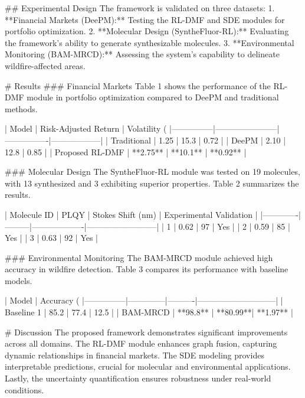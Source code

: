 ## Experimental Design
The framework is validated on three datasets:
1. **Financial Markets (DeePM):** Testing the RL-DMF and SDE modules for portfolio optimization.
2. **Molecular Design (SyntheFluor-RL):** Evaluating the framework’s ability to generate synthesizable molecules.
3. **Environmental Monitoring (BAM-MRCD):** Assessing the system's capability to delineate wildfire-affected areas.

# Results
### Financial Markets
Table 1 shows the performance of the RL-DMF module in portfolio optimization compared to DeePM and traditional methods.

| Model         | Risk-Adjusted Return | Volatility (%
|---------------|-----------------------|----------------|------------------|
| Traditional   | 1.25                 | 15.3           | 0.72             |
| DeePM         | 2.10                 | 12.8           | 0.85             |
| Proposed RL-DMF | **2.75**            | **10.1**       | **0.92**         |

### Molecular Design
The SyntheFluor-RL module was tested on 19 molecules, with 13 synthesized and 3 exhibiting superior properties. Table 2 summarizes the results.

| Molecule ID | PLQY    | Stokes Shift (nm) | Experimental Validation |
|-------------|---------|-------------------|--------------------------|
| 1           | 0.62    | 97                | Yes                      |
| 2           | 0.59    | 85                | Yes                      |
| 3           | 0.63    | 92                | Yes                      |

### Environmental Monitoring
The BAM-MRCD module achieved high accuracy in wildfire detection. Table 3 compares its performance with baseline models.

| Model         | Accuracy (%
|---------------|--------------|----------|-----------------------------|
| Baseline 1    | 85.2         | 77.4     | 12.5                        |
| BAM-MRCD      | **98.8**     | **80.99**| **1.97**                    |

# Discussion
The proposed framework demonstrates significant improvements across all domains. The RL-DMF module enhances graph fusion, capturing dynamic relationships in financial markets. The SDE modeling provides interpretable predictions, crucial for molecular and environmental applications. Lastly, the uncertainty quantification ensures robustness under real-world conditions.

